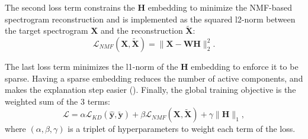 The second loss term constrains the $\mathbf{H}$ embedding to minimize the NMF-based spectrogram reconstruction and is implemented as the squared l2-norm between the target spectrogram $\mathbf{X}$ and the reconstruction $\tilde{\mathbf{X}}$:
\begin{equation}
    \mathcal{L}_{NMF}(\mathbf{X},\tilde{\mathbf{X}})=\|\mathbf{X}-\mathbf{W}\mathbf{H}\|_2^2.
\end{equation}

The last loss term minimizes the l1-norm of the $\mathbf{H}$ embedding to enforce it to be sparse.
Having a sparse embedding reduces the number of active components, and makes the explanation step easier ().
Finally, the global training objective is the weighted sum of the 3 terms:
\begin{equation}
    \mathcal{L} = \alpha \mathcal{L}_{KD}(\hat{\mathbf{y}},\tilde{\mathbf{y}}) + \beta \mathcal{L}_{NMF}(\mathbf{X},\tilde{\mathbf{X}}) + \gamma \|\mathbf{H}\|_1,
\end{equation}
where $(\alpha, \beta, \gamma)$ is a triplet of hyperparameters to weight each term of the loss.



